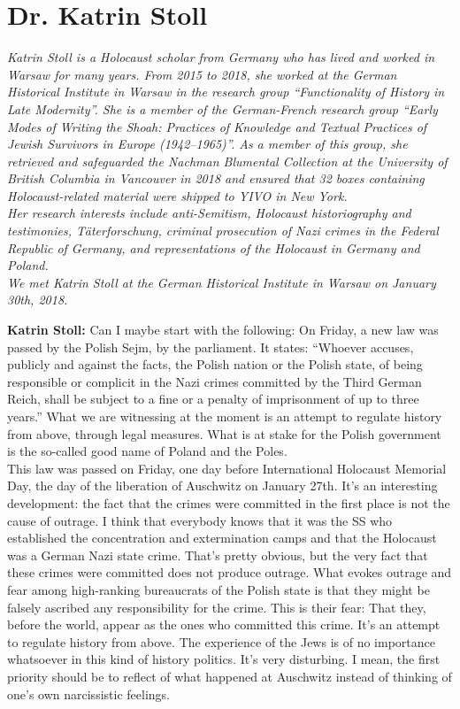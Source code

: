 \section{Dr. Katrin Stoll} 

\textit{Katrin Stoll is a Holocaust scholar from Germany who has lived and worked in Warsaw for many years. From 2015 to 2018, she worked at the German Historical Institute in Warsaw in the research group ``Functionality of History in Late Modernity''. She is a member of the German-French research group ``Early Modes of Writing the Shoah: Practices of Knowledge and Textual Practices of Jewish Survivors in Europe (1942–1965)''. As a member of this group, she retrieved and safeguarded the Nachman Blumental Collection at the University of British Columbia in Vancouver in 2018 and ensured that 32 boxes containing Holocaust-related material were shipped to YIVO in New York. \\
Her research interests include anti-Semitism, Holocaust historiography and testimonies, Täterforschung, criminal prosecution of Nazi crimes in the Federal Republic of Germany, and representations of the Holocaust in Germany and Poland. \\
We met Katrin Stoll at the German Historical Institute in Warsaw on January 30th, 2018.}\par 
\vspace*{2em}
\textbf{Katrin Stoll:} Can I maybe start with the following: On Friday, a new law was passed by the Polish Sejm, by the parliament. It states: ``Whoever accuses, publicly and against the facts, the Polish nation or the Polish state, of being responsible or complicit in the Nazi crimes committed by the Third German Reich, shall be subject to a fine or a penalty of imprisonment of up to three years.'' What we are witnessing at the moment is an attempt to regulate history from above, through legal measures. What is at stake for the Polish government is the so-called good name of Poland and the Poles.\\ 
This law was passed on Friday, one day before International Holocaust Memorial Day, the day of the liberation of Auschwitz on January 27th. It’s an interesting development: the fact that the crimes were committed in the first place is not the cause of outrage. I think that everybody knows that it was the SS who established the concentration and extermination camps and that the Holocaust was a German Nazi state crime. That’s pretty obvious, but the very fact that these crimes were committed does not produce outrage. What evokes outrage and fear among high-ranking bureaucrats of the Polish state is that they might be falsely ascribed any responsibility for the crime. This is their fear: That they, before the world, appear as the ones who committed this crime. It’s an attempt to regulate history from above. The experience of the Jews is of no importance whatsoever in this kind of history politics. It's very disturbing. I mean, the first priority should be to reflect of what happened at Auschwitz instead of thinking of one’s own narcissistic feelings. 

